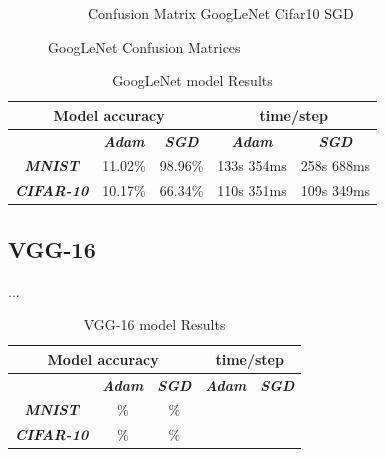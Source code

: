 \documentclass[conference]{IEEEtran}
\begin{document}
\begin{figure}[!htbp]
\begin{subfigure}[b]{0.22\textwidth}
        \caption{Confusion Matrix GoogLeNet Cifar10 SGD}
        \label{fig:x matrix_GoogLeNet_CIFAR_SGD}
    \end{subfigure}
    \caption{GoogLeNet Confusion Matrices}
    \label{fig:GoogLeNet Confusion Matrixis}
\end{figure}

\begin{table}[!htbp]
    \caption{GoogLeNet model Results}
    \begin{center}
    \begin{tabular}{|c|c|c|c|c|}
    \cline{1-5} 
    \multicolumn{3}{|c|}{\textbf{Model accuracy}} & \multicolumn{2}{|c|}{\textbf{time/step}} \\
    \hline 
    \textit{} & \textbf{\textit{Adam}} & \textbf{\textit{SGD}} & \textbf{\textit{Adam}} & \textbf{\textit{SGD}} \\
    \hline
    \textbf{\textit{MNIST}} & 11.02\% & 98.96\% & 133s 354ms & 258s 688ms \\
    \hline
    \textbf{\textit{CIFAR-10}} & 10.17\% & 66.34\% & 110s 351ms & 109s 349ms \\
    \cline{1-5} 
    \end{tabular}
    \label{tab: GoogLeNet model accuracy}
    \end{center}
\end{table}

\subsection{VGG-16}
...
\begin{table}[!htbp]
    \caption{VGG-16 model Results}
    \begin{center}
    \begin{tabular}{|c|c|c|c|c|}
    \cline{1-5} 
    \multicolumn{3}{|c|}{\textbf{Model accuracy}} & \multicolumn{2}{|c|}{\textbf{time/step}} \\
    \hline 
    \textit{} & \textbf{\textit{Adam}} & \textbf{\textit{SGD}} & \textbf{\textit{Adam}} & \textbf{\textit{SGD}} \\
    \hline
    \textbf{\textit{MNIST}} & \% & \% &  &  \\
    \hline
    \textbf{\textit{CIFAR-10}} & \% & \% &  &  \\
    \cline{1-5} 
    \end{tabular}
    \label{tab: VGG model accuracy}
    \end{center}
\end{table}
\end{document}
